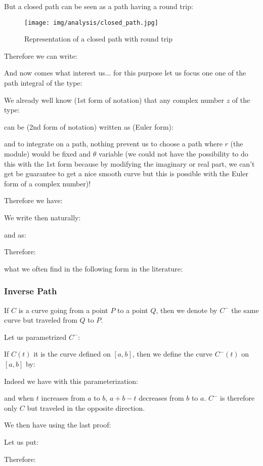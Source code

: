	But a closed path can be seen as a path having a round trip:
	\begin{figure}[H]
		\begin{center}
			\texttt{[image: img/analysis/closed\_path.jpg]}
		\end{center}	
		\caption{Representation of a closed path with round trip}
	\end{figure}
	Therefore we can write:
	
	And now comes what interest us... for this purpose let us focus one one of the path integral of the type:
	
	We already well know (1st form of notation) that any complex number $z$ of the type:
	
	can be (2nd form of notation) written as (Euler form):
	
	and to integrate on a path, nothing prevent us to choose a path where $r$ (the module) would be fixed and $\theta$ variable (we could not have the possibility to do this with the 1st form because by modifying the imaginary or real part, we can't get be guarantee to get a nice smooth curve but this is possible with the Euler form of a complex number)!
	
	Therefore we have:
	
	We write then naturally:
	
	and as:
	
	Therefore:
	
	what we often find in the following form in the literature:
	
	
	
	\subsubsection{Inverse Path}
	If $C$ is a curve going from a point $P$ to a point $Q$, then we denote by $C^-$  the same curve but traveled from $Q$ to $P$.
	
	Let us parametrized $C^-$:
	
	If $C(t)$ it is the curve defined on $[a, b]$, then we define the curve $C^-(t)$ on $[a, b]$ by:
	
	Indeed we have with this parameterization:
	
	and when $t$ increases from $a$ to $b$, $a + b - t$ decreases from $b$ to $a$. $C^-$ is therefore only $C$ but traveled in the opposite direction.
	
	We then have using the last proof:
	
	Let us put:
	
	Therefore:
	
